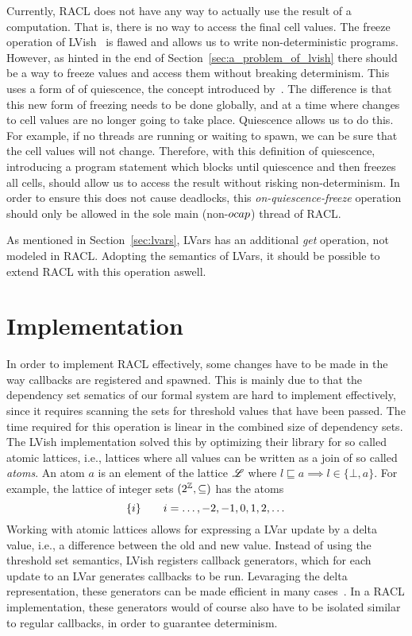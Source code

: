 Currently, RACL does not have any way to actually use the result of a
computation. That is, there is no way to access the final cell values. The
freeze operation of LVish~\parencite{kuper2014freeze} is flawed and allows us to
write non-deterministic programs.  However, as hinted in the end of
Section~\ref{sec:a_problem_of_lvish} there should be a way to freeze values and
access them without breaking determinism.  This uses a form of of quiescence,
the concept introduced by~\textcite{kuper2014freeze}. The difference is that
this new form of freezing needs to be done globally, and at a time where changes
to cell values are no longer going to take place. Quiescence allows us to do
this. For example, if no threads are running or waiting to spawn,
we can be sure that the cell values will not change. Therefore, with this
definition of quiescence, introducing a program statement which blocks until
quiescence and then freezes all cells, should allow us to access the result
without risking non-determinism. In order to ensure this does not cause
deadlocks, this \emph{on-quiescence-freeze} operation should only be allowed in
the sole main (non-$\mbox{$ocap$}$) thread of RACL.

As mentioned in Section~\ref{sec:lvars}, LVars has an additional \emph{get}
operation, not modeled in RACL. Adopting the semantics of LVars, it should be
possible to extend RACL with this operation aswell.

\section{Implementation}%
\label{sec:implementation}

In order to implement RACL effectively, some changes have to be made in the way
callbacks are registered and spawned. This is mainly due to that the dependency
set sematics of our formal system are hard to implement effectively, since it
requires scanning the sets for threshold values that have been passed. The time
required for this operation is linear in the combined size of dependency sets.
The LVish implementation solved this by optimizing their library for so called
atomic lattices, i.e., lattices where all values can be written as a join of so
called \emph{atoms}. An atom $a$ is an element of the lattice $\mbox{$\mathscr{L}$}$ where
$l \sqsubseteq a \implies l \in \{\bot, a\}$. For example, the lattice of
integer sets $(2^{\mathbb{Z}}, \subseteq)$ has the atoms
\begin{equation*}
  \{ i \} \quad\quad i = \dots, -2, -1, 0, 1, 2,\dots
\end{equation*}
Working with atomic lattices allows for expressing a LVar update by a delta
value, i.e., a difference between the old and new value. Instead of using the
threshold set semantics, LVish registers callback generators, which for each
update to an LVar generates callbacks to be run. Levaraging the delta
representation, these generators can be made efficient in many
cases~\parencite{kuper2014freeze}. In a RACL implementation, these generators
would of course also have to be isolated similar to regular callbacks, in
order to guarantee determinism.


